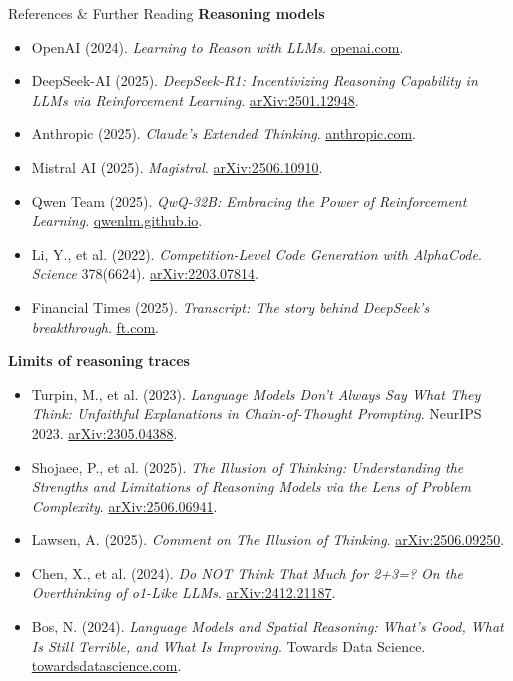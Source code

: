 \begin{frame}[allowframebreaks]{References \& Further Reading}
  \textbf{Reasoning models}
  \begin{itemize}\itemsep0.3em
    \item OpenAI (2024). \emph{Learning to Reason with LLMs}. \href{https://openai.com/index/learning-to-reason-with-llms/}{openai.com}.
    \item DeepSeek-AI (2025). \emph{DeepSeek-R1: Incentivizing Reasoning Capability in LLMs via Reinforcement Learning}. \href{https://arxiv.org/abs/2501.12948}{arXiv:2501.12948}.
    \item Anthropic (2025). \emph{Claude's Extended Thinking}. \href{https://www.anthropic.com/news/visible-extended-thinking}{anthropic.com}.
    \item Mistral AI (2025). \emph{Magistral}. \href{https://arxiv.org/abs/2506.10910}{arXiv:2506.10910}.
    \item Qwen Team (2025). \emph{QwQ-32B: Embracing the Power of Reinforcement Learning}. \href{https://qwenlm.github.io/blog/qwq-32b/}{qwenlm.github.io}.
    \item Li, Y., et al. (2022). \emph{Competition-Level Code Generation with AlphaCode}. \emph{Science} 378(6624). \href{https://arxiv.org/abs/2203.07814}{arXiv:2203.07814}.
    \item Financial Times (2025). \emph{Transcript: The story behind DeepSeek's breakthrough}. \href{https://www.ft.com/content/d23a01d8-4256-4142-a52c-a393ed6df1bc}{ft.com}.
  \end{itemize}
  \vspace{0.4em}
  \textbf{Limits of reasoning traces}
  \begin{itemize}\itemsep0.3em
    \item Turpin, M., et al. (2023). \emph{Language Models Don't Always Say What They Think: Unfaithful Explanations in Chain-of-Thought Prompting}. NeurIPS 2023. \href{https://arxiv.org/abs/2305.04388}{arXiv:2305.04388}.
    \item Shojaee, P., et al. (2025). \emph{The Illusion of Thinking: Understanding the Strengths and Limitations of Reasoning Models via the Lens of Problem Complexity}. \href{https://arxiv.org/abs/2506.06941}{arXiv:2506.06941}.
    \item Lawsen, A. (2025). \emph{Comment on The Illusion of Thinking}. \href{https://arxiv.org/abs/2506.09250}{arXiv:2506.09250}.
    \item Chen, X., et al. (2024). \emph{Do NOT Think That Much for 2+3=? On the Overthinking of o1-Like LLMs}. \href{https://arxiv.org/abs/2412.21187}{arXiv:2412.21187}.
    \item Bos, N. (2024). \emph{Language Models and Spatial Reasoning: What's Good, What Is Still Terrible, and What Is Improving}. Towards Data Science. \href{https://towardsdatascience.com/language-models-and-spatial-reasoning-whats-good-what-is-still-terrible-and-what-is-improving-175d2099eb4c/}{towardsdatascience.com}.
  \end{itemize}
\end{frame}
